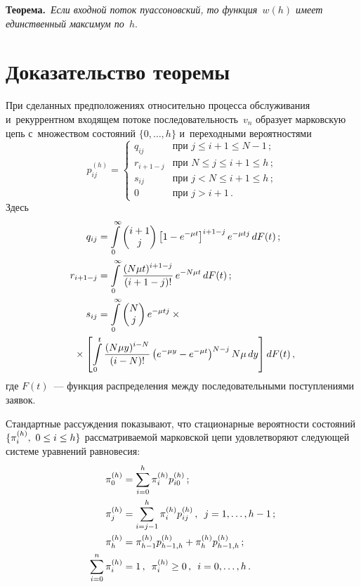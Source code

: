 \begin{multicols}{2}
  \noindent
  \textbf{Теорема.}\ \textit{Если входной поток пуассоновский, то 
функция~$w(h)$ имеет единственный максимум по~$h$}.
  
  
  \section{Доказательство теоремы}
  
  При сделанных предположениях относительно процесса обслуживания 
и~рекуррентном входящем потоке последовательность~$v_n$ образует 
марковскую цепь с~множеством состояний $\{0, \ldots , h\}$ и~переходными 
вероятностями
  $$
  p_{ij}^{(h)} =\begin{cases}
  q_{ij} &\mbox{при } j\leq i+1\leq N-1\,;\\[3pt]
  r_{i+1-j} &\mbox{при } N\leq j\leq i+1\leq h\,;\\[3pt]
  s_{ij} &\mbox{при } j<N\leq i+1\leq h\,;\\[3pt]
  0 &\mbox{при } j>i+1\,.
  \end{cases}
  $$
Здесь
\begin{align*}
q_{ij} &= \int\limits_0^\infty \begin{pmatrix}
i+1\\ j\end{pmatrix} 
\left[ 1-e^{-\mu t}\right]^{i+1-j} e^{-\mu t j} \,dF(t)\,;\\
r_{i+1-j}&=\int\limits_0^\infty \fr{(N\mu t)^{i+1-j}}{(i+1-j)!}\,e^{-N\mu t}\, dF(t)\,;\\
s_{ij}&= \int\limits_0^\infty \begin{pmatrix}
N\\ j\end{pmatrix}
e^{-\mu t j} \times{}\\
&\hspace*{-24pt}{}\times \left[ \int\limits^t_0 \fr{(N\mu y)^{i-N}} {(i-N)!}\left( 
e^{-\mu y} -e^{-\mu t}\right)^{N-j} N \mu\,dy\right]dF(t)\,,
\end{align*}
где $F(t)$~--- функция распределения между последовательными поступлениями 
заявок.

  Стандартные рассуждения показывают, что стационарные вероятности 
состояний $\{ \pi_i^{(h)}, \ 0\hm\leq i\hm\leq h\}$ рассматриваемой марковской 
цепи удовлетворяют следующей системе уравнений равновесия:
  \begin{align*}
  \pi_0^{(h)} &=\sum\limits^h_{i=0} \pi_i^{(h)} p_{i0}^{(h)}\,;\\ 
  \pi_j^{(h)}&=\sum\limits^h_{i=j-1} \pi_i^{(h)} p_{ij}^{(h)}\,,\enskip
j=1,\ldots , h-1\,;\\
  \pi_h^{(h)}& =\pi^{(h)}_{h-1} p^{(h)}_{h-1,h} +\pi_h^{(h)} p^{(h)}_{h-
1,h}\,;\\ 
  \sum\limits^n_{i=0}\pi_i^{(h)}&=1\,,\enskip \pi_i^{(h)} \geq 0\,,\enskip i=0,\ldots , 
h\,.
  \end{align*}
  

\end{multicols}
